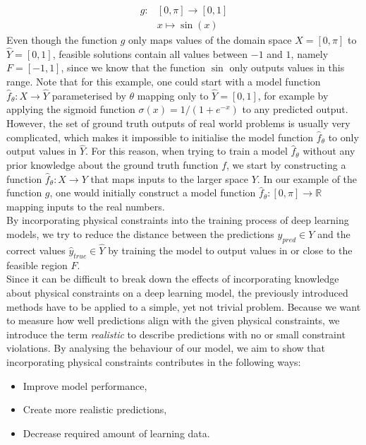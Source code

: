 \begin{equation}
\label{example_fn}
\begin{aligned}
g: &[0, \pi] \to [0, 1]\\
&x \mapsto \sin(x)
\end{aligned}
\end{equation}
Even though the function $g$ only maps values of the domain space $X = [0, \pi]$ to $\hat{Y} = [0, 1]$, feasible solutions contain all values between $-1$ and $1$, namely $F = [-1, 1]$, since we know that the function $\sin$ only outputs values in this range. Note that for this example, one could start with a model function $\hat{f}_\theta: X \to \hat{Y}$ parameterised by $\theta$ mapping only to $\hat{Y} = [0, 1]$, for example by applying the sigmoid function $\sigma(x) = 1 / (1 + e^{-x})$ to any predicted output. However, the set of ground truth outputs of real world problems is usually very complicated, which makes it impossible to initialise the model function $\hat{f}_\theta$ to only output values in $\hat{Y}$. For this reason, when trying to train a model $\hat{f}_\theta$ without any prior knowledge about the ground truth function $f$, we start by constructing a function $\hat{f}_\theta: X \to Y$ that maps inputs to the larger space $Y$. In our example of the function $g$, one would initially construct a model function $\hat{f}_\theta: [0, \pi] \to \mathbb{R}$ mapping inputs to the real numbers.\\
\indent By incorporating physical constraints into the training process of deep learning models, we try to reduce the distance between the predictions $y_{pred} \in Y$ and the correct values $\hat{y}_{true} \in \hat{Y}$ by training the model to output values in or close to the feasible region $F$.\\
\indent Since it can be difficult to break down the effects of incorporating knowledge about physical constraints on a deep learning model, the previously introduced methods have to be applied to a simple, yet not trivial problem. Because we want to measure how well predictions align with the given physical constraints, we introduce the term \textit{realistic} to describe predictions with no or small constraint violations. By analysing the behaviour of our model, we aim to show that incorporating physical constraints contributes in the following ways:
\begin{itemize}
	\item Improve model performance,
	\item Create more realistic predictions,
	\item Decrease required amount of learning data.
\end{itemize}
